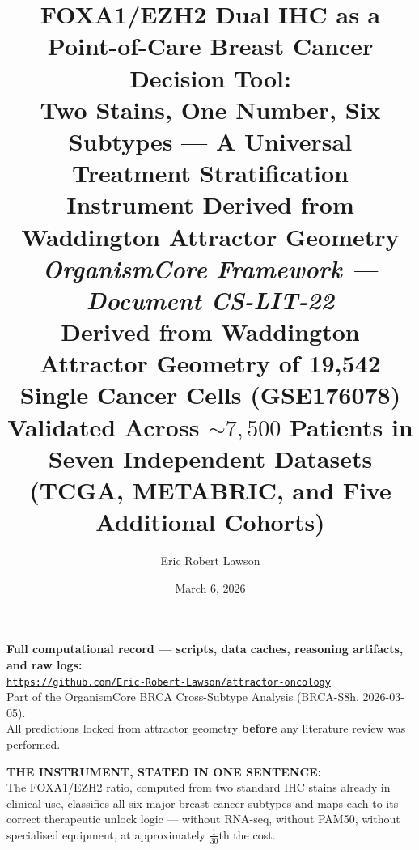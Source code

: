 \documentclass[12pt, a4paper]{article}
\title{
    \vspace{-1em}
    \textbf{FOXA1/EZH2 Dual IHC as a Point-of-Care
    Breast Cancer Decision Tool:}\\[0.5em]
    \large Two Stains, One Number, Six Subtypes ---
    A Universal Treatment Stratification Instrument
    Derived from Waddington Attractor Geometry\\[0.4em]
    \normalsize \textit{OrganismCore Framework ---
    Document CS-LIT-22}\\[0.3em]
    \small Derived from Waddington Attractor Geometry
    of 19,542 Single Cancer Cells (GSE176078)\\[0.3em]
    \small Validated Across ${\sim}7{,}500$ Patients
    in Seven Independent Datasets
    (TCGA, METABRIC, and Five Additional Cohorts)
}
\author[1]{Eric Robert Lawson}
\affil[1]{
    OrganismCore\\
    \href{mailto:OrganismCore@proton.me}
         {OrganismCore@proton.me}\\
    ORCID:
    \href{https://orcid.org/0009-0002-0414-6544}
         {0009-0002-0414-6544}
}
\date{March 6, 2026}
\begin{document}

\maketitle
\thispagestyle{fancy}

\begin{center}
\colorbox{repobox}{
\begin{minipage}{0.88\textwidth}
\vspace{0.5em}
\centering
\textbf{Full computational record --- scripts, data
caches, reasoning artifacts, and raw logs:}\\[0.4em]
\href{https://github.com/Eric-Robert-Lawson/attractor-oncology}
{\texttt{https://github.com/Eric-Robert-Lawson/attractor-oncology}}
\\[0.3em]
\small Part of the OrganismCore BRCA Cross-Subtype
Analysis (BRCA-S8h, 2026-03-05).\\
All predictions locked from attractor geometry
\textbf{before} any literature review was performed.
\vspace{0.5em}
\end{minipage}}
\end{center}

\vspace{1em}

\begin{center}
\colorbox{findingbox}{
\begin{minipage}{0.88\textwidth}
\vspace{0.5em}
\textbf{THE INSTRUMENT, STATED IN ONE SENTENCE:}\\[0.5em]
The FOXA1/EZH2 ratio, computed from two standard IHC
stains already in clinical use, classifies all six major
breast cancer subtypes and maps each to its correct
therapeutic unlock logic --- without RNA-seq, without
PAM50, without specialised equipment, at approximately
$\frac{1}{30}$th the cost.
\vspace{0.5em}
\end{minipage}}
\end{center}

\vspace{1em}
\end{document}
